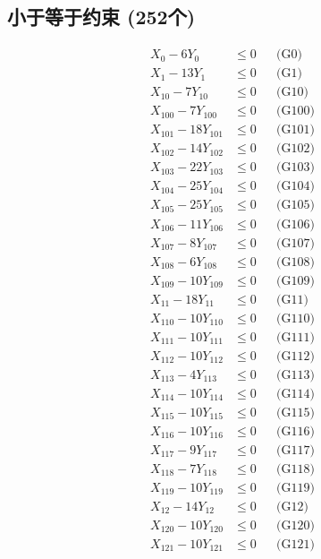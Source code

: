 \documentclass[a4paper,10pt]{article}
\begin{document}
\subsection{小于等于约束 (252个)}

\allowdisplaybreaks
{\small\begin{align}
X_{0} - 6Y_{0} &\leq 0 && \text{(G0)} \\
X_{1} - 13Y_{1} &\leq 0 && \text{(G1)} \\
X_{10} - 7Y_{10} &\leq 0 && \text{(G10)} \\
X_{100} - 7Y_{100} &\leq 0 && \text{(G100)} \\
X_{101} - 18Y_{101} &\leq 0 && \text{(G101)} \\
X_{102} - 14Y_{102} &\leq 0 && \text{(G102)} \\
X_{103} - 22Y_{103} &\leq 0 && \text{(G103)} \\
X_{104} - 25Y_{104} &\leq 0 && \text{(G104)} \\
X_{105} - 25Y_{105} &\leq 0 && \text{(G105)} \\
X_{106} - 11Y_{106} &\leq 0 && \text{(G106)} \\
X_{107} - 8Y_{107} &\leq 0 && \text{(G107)} \\
X_{108} - 6Y_{108} &\leq 0 && \text{(G108)} \\
X_{109} - 10Y_{109} &\leq 0 && \text{(G109)} \\
X_{11} - 18Y_{11} &\leq 0 && \text{(G11)} \\
X_{110} - 10Y_{110} &\leq 0 && \text{(G110)} \\
X_{111} - 10Y_{111} &\leq 0 && \text{(G111)} \\
X_{112} - 10Y_{112} &\leq 0 && \text{(G112)} \\
X_{113} - 4Y_{113} &\leq 0 && \text{(G113)} \\
X_{114} - 10Y_{114} &\leq 0 && \text{(G114)} \\
X_{115} - 10Y_{115} &\leq 0 && \text{(G115)} \\
\allowbreak
X_{116} - 10Y_{116} &\leq 0 && \text{(G116)} \\
X_{117} - 9Y_{117} &\leq 0 && \text{(G117)} \\
X_{118} - 7Y_{118} &\leq 0 && \text{(G118)} \\
X_{119} - 10Y_{119} &\leq 0 && \text{(G119)} \\
X_{12} - 14Y_{12} &\leq 0 && \text{(G12)} \\
X_{120} - 10Y_{120} &\leq 0 && \text{(G120)} \\
X_{121} - 10Y_{121} &\leq 0 && \text{(G121)} \\

\end{align}}
\end{document}
